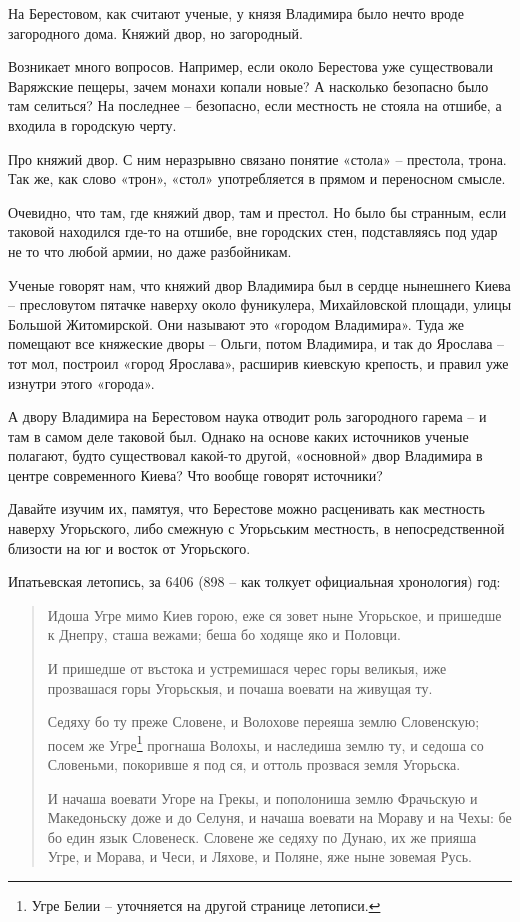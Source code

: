 На Берестовом, как считают ученые, у князя Владимира было нечто вроде загородного дома. Княжий двор, но загородный. %

Возникает много вопросов. Например, если около Берестова уже существовали Варяжские пещеры, зачем монахи копали новые? А насколько безопасно было там селиться? На последнее – безопасно, если местность не стояла на отшибе, а входила в городскую черту.


Про княжий двор. С ним неразрывно связано понятие «стола» – престола, трона. Так же, как слово «трон», «стол» употребляется в прямом и переносном смысле.

Очевидно, что там, где княжий двор, там и престол. Но было бы странным, если таковой находился где-то на отшибе, вне городских стен, подставляясь под удар не то что любой армии, но даже разбойникам. 
 
Ученые говорят нам, что княжий двор Владимира был в сердце нынешнего Киева – пресловутом пятачке наверху около фуникулера, Михайловской площади, улицы Большой Житомирской. Они называют это «городом Владимира». Туда же помещают все княжеские дворы – Ольги, потом Владимира, и так до Ярослава – тот мол, построил «город Ярослава», расширив киевскую крепость, и правил уже изнутри этого «города».

А двору Владимира на Берестовом наука отводит роль загородного гарема – и там в самом деле таковой был. Однако на основе каких источников ученые полагают, будто существовал какой-то другой, «основной» двор Владимира в центре современного Киева? Что вообще говорят источники?

Давайте изучим их, памятуя, что Берестове можно расценивать как местность наверху Угорьского, либо смежную с Угорьським местность, в непосредственной близости на юг и восток от Угорьского.

Ипатьевская летопись, за 6406 (898 – как толкует официальная хронология) год:

\begin{quotation}
Идоша Угре мимо Киев горою, еже ся зовет ныне Угорьское, и пришедше к Днепру, сташа вежами; беша бо ходяще яко и Половци.

И пришедше от въстока и устремишася черес горы великыя, иже прозвашася горы Угорьскыя, и почаша воевати на живущая ту. 

Седяху бо ту преже Словене, и Волохове переяша землю Словенскую; посем же Угре\footnote{Угре Белии – уточняется на другой странице летописи.} прогнаша Волохы, и наследиша землю ту, и седоша со Словеньми, покоривше я под ся, и оттоль прозвася земля Угорьска.

И начаша воевати Угоре на Грекы, и пополониша землю Фрачьскую и Македоньску доже и до Селуня, и начаша воевати на Мораву и на Чехы: бе бо един язык Словенеск. Словене же седяху по Дунаю, их же прияша Угре, и Морава, и Чеси, и Ляхове, и Поляне, яже ныне зовемая Русь.
\end{quotation}

